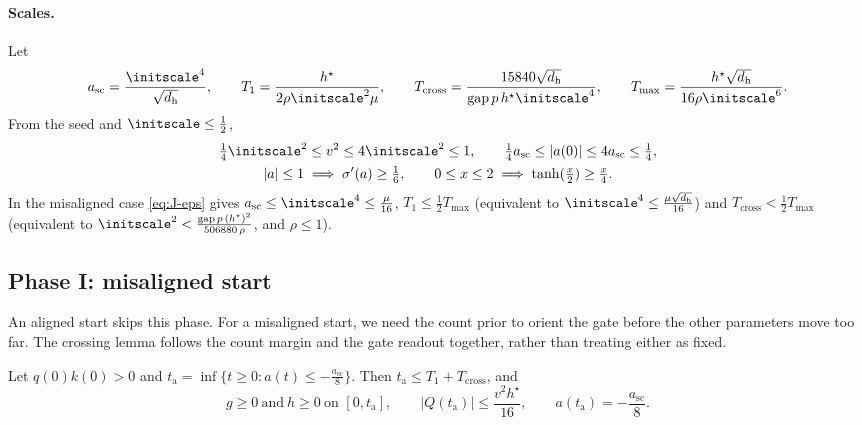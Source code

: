 \paragraph{Scales.} Let
\[
 a_{\mathrm{sc}}=\frac{\initscale^4}{\sqrt{d_{\mathrm h}}},\qquad T_1=\frac{h^\star}{2\rho\initscale^2\mu},\qquad
 T_{\mathrm{cross}}=\frac{15840\sqrt{d_{\mathrm h}}}{\mathrm{gap}\,p\,h^\star\initscale^4},\qquad T_{\max}=\frac{h^\star\sqrt{d_{\mathrm h}}}{16\rho\initscale^6}.
\]
From the seed and $\initscale\le\frac{1}{2}$,
\begin{equation}
 \begin{gathered}
 \tfrac{1}{4}\initscale^2\le v^2\le4\initscale^2\le1,\qquad \tfrac{1}{4}a_{\mathrm{sc}}\le|a(0)|\le4a_{\mathrm{sc}}\le\tfrac{1}{4},\\
 |a|\le1\implies\sigma'(a)\ge\tfrac{1}{6},\qquad 0\le x\le2\implies\tanh(\tfrac{x}{2})\ge\tfrac{x}{4} .
 \end{gathered}
 \label{eq:J-scales}
\end{equation}
In the misaligned case \cref{eq:J-eps} gives $a_{\mathrm{sc}}\le\initscale^4\le\frac{\mu}{16}$, $T_1\le\frac{1}{2}T_{\max}$ (equivalent to $\initscale^4\le\frac{\mu\sqrt{d_{\mathrm h}}}{16}$) and
$T_{\mathrm{cross}}<\frac{1}{2}T_{\max}$ (equivalent to $\initscale^2<\frac{\mathrm{gap}\,p\,(h^\star)^2}{506880\,\rho}$, and $\rho\le1$).

\subsection{Phase I: misaligned start}

An aligned start skips this phase. For a misaligned start, we need the count prior to orient the gate before the other parameters
move too far. The crossing lemma follows the count margin and the gate readout together, rather than treating either as fixed.

\begin{lemma}[Crossing]
\label{lem:J-cross}
Let $q(0)k(0)>0$ and $t_{\mathrm a}=\inf\{t\ge0:a(t)\le-\frac{a_{\mathrm{sc}}}{8}\}$. Then $t_{\mathrm a}\le T_1+T_{\mathrm{cross}}$, and
\[
 g\ge0\ \text{and}\ h\ge0\ \text{on }[0,t_{\mathrm a}],\qquad |Q(t_{\mathrm a})|\le\frac{v^2h^\star}{16},\qquad a(t_{\mathrm a})=-\frac{a_{\mathrm{sc}}}{8}.
\]
\end{lemma}

